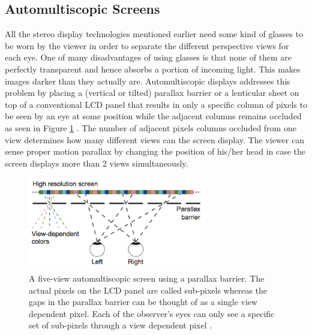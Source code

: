 \subsection{Automultiscopic Screens}

All the stereo display technologies mentioned earlier need some kind of glasses to be worn by the viewer in order to separate the different perspective views for each eye. One of many disadvantages of using glasses is that none of them are perfectly transparent and hence absorbs a portion of incoming light. This makes images darker than they actually are. Automultiscopic displays addresses this problem by placing a (vertical or tilted) parallax barrier or a lenticular sheet on top of a conventional LCD panel that results in only a specific column of pixels to be seen by an eye at some position while the adjacent columns remains occluded as seen in Figure \ref{fig:parallax_barrier} \cite{zwicker2006antialiasing}. The number of adjacent pixels columns occluded from one view determines how many different views can the screen display. The viewer can sense proper motion parallax by changing the position of his/her head in case the screen displays more than 2 views simultaneously.
\begin{figure}
\centering
    \includegraphics[width=0.7\textwidth]{./Template_Figures/parallax_barrier}
    \caption{A five-view automultiscopic screen using a parallax barrier. The actual pixels on the LCD panel are called sub-pixels whereas the gaps in the parallax barrier can be thought of as a single view dependent pixel. Each of the observer's eyes can only see a specific set of sub-pixels through a view dependent pixel \cite{zwicker2006antialiasing}.\label{fig:parallax_barrier}}
\end{figure}

